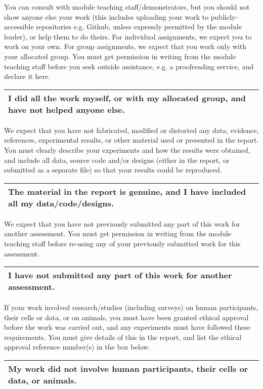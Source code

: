 \noindent You can consult with module teaching staff/demonstrators, but you should not show anyone else
your work (this includes uploading your work to publicly-accessible repositories e.g. Github, unless
expressly permitted by the module leader), or help them to do theirs. For individual assignments,
we expect you to work on your own. For group assignments, we expect that you work only with
your allocated group. You must get permission in writing from the module teaching staff before
you seek outside assistance, e.g. a proofreading service, and declare it here.

\begin{longtable}[ht]{ | p{\textwidth} | }
  \hline
  \textbf{I did all the work myself, or with my allocated group, and have not helped anyone else.}
  \\\hline
\end{longtable}

\noindent We expect that you have not fabricated, modified or distorted any data, evidence, references,
experimental results, or other material used or presented in the report. You must clearly describe
your experiments and how the results were obtained, and include all data, source code and/or
designs (either in the report, or submitted as a separate file) so that your results could be
reproduced. 
\vspace{4mm}
\begin{longtable}[ht]{ | p{\textwidth} | }
  \hline
  \textbf{The material in the report is genuine, and I have included all my data/code/designs. }
  \\\hline
\end{longtable}

\noindent We expect that you have not previously submitted any part of this work for another assessment.
You must get permission in writing from the module teaching staff before re-using any of your
previously submitted work for this assessment.

\begin{longtable}[ht]{ | p{\textwidth} | }
  \hline
  \textbf{I have not submitted any part of this work for another assessment.}
  \\\hline
\end{longtable}

\noindent If your work involved research/studies (including surveys) on human participants, their cells or
data, or on animals, you must have been granted ethical approval before the work was carried
out, and any experiments must have followed these requirements. You must give details of this in
the report, and list the ethical approval reference number(s) in the box below.

\begin{longtable}[ht]{ | p{\textwidth} | }
  \hline
  \textbf{My work did not involve human participants, their cells or data, or animals.}
  \\\hline
\end{longtable}